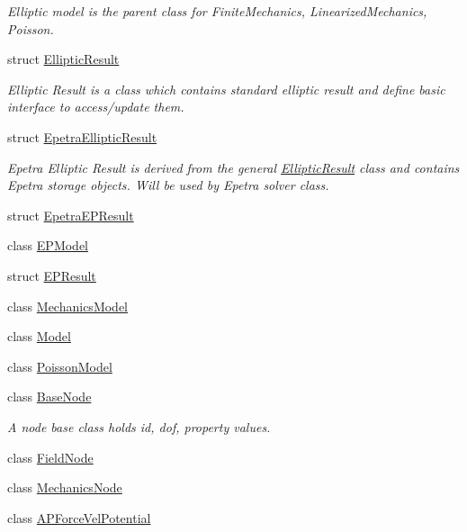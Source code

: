 \begin{DoxyCompactItemize}
\begin{DoxyCompactList}\small\item\em Elliptic model is the parent class for FiniteMechanics, LinearizedMechanics, Poisson. \item\end{DoxyCompactList}\item 
struct \hyperlink{structvoom_1_1_elliptic_result}{EllipticResult}
\begin{DoxyCompactList}\small\item\em Elliptic Result is a class which contains standard elliptic result and define basic interface to access/update them. \item\end{DoxyCompactList}\item 
struct \hyperlink{structvoom_1_1_epetra_elliptic_result}{EpetraEllipticResult}
\begin{DoxyCompactList}\small\item\em Epetra Elliptic Result is derived from the general \hyperlink{structvoom_1_1_elliptic_result}{EllipticResult} class and contains Epetra storage objects. Will be used by Epetra solver class. \item\end{DoxyCompactList}\item 
struct \hyperlink{structvoom_1_1_epetra_e_p_result}{EpetraEPResult}
\item 
class \hyperlink{classvoom_1_1_e_p_model}{EPModel}
\item 
struct \hyperlink{structvoom_1_1_e_p_result}{EPResult}
\item 
class \hyperlink{classvoom_1_1_mechanics_model}{MechanicsModel}
\item 
class \hyperlink{classvoom_1_1_model}{Model}
\item 
class \hyperlink{classvoom_1_1_poisson_model}{PoissonModel}
\item 
class \hyperlink{classvoom_1_1_base_node}{BaseNode}
\begin{DoxyCompactList}\small\item\em A node base class holds id, dof, property values. \item\end{DoxyCompactList}\item 
class \hyperlink{classvoom_1_1_field_node}{FieldNode}
\item 
class \hyperlink{classvoom_1_1_mechanics_node}{MechanicsNode}
\item 
class \hyperlink{classvoom_1_1_a_p_force_vel_potential}{APForceVelPotential}

\end{DoxyCompactItemize}
